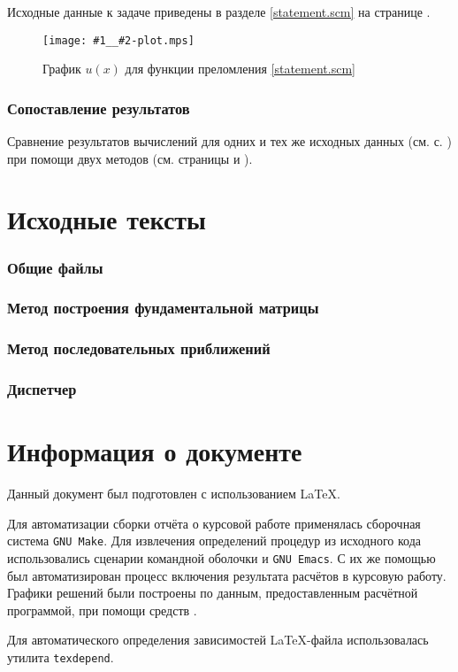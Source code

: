 \documentclass{article}
\newcommand{\includeplot}[2]{\begin{figure}[hb]
    \centering
    \texttt{[image: \#1\_\_\#2-plot.mps]}
    \caption{График $u(x)$ для функции преломления \eqref{#2}}
\end{figure}}
\numberwithin{equation}{section}
\begin{document}
Исходные данные к задаче приведены в разделе \ref{statement.scm} на
странице \pageref{statement.scm}.



\includeplot{iterative}{statement.scm}

\clearpage
\section{Сопоставление результатов}

Сравнение результатов вычислений для одних и тех же исходных данных
(см. с. \pageref{statement.scm}) при помощи двух методов (см. страницы
\pageref{fundmatrix__statement.scm-results} и
\pageref{iterative__statement.scm-results}).

\clearpage
\appendix
\part{Исходные тексты}
\section{Общие файлы}




\clearpage
\section{Метод построения  фундаментальной матрицы}



\clearpage
\section{Метод последовательных приближений}



\clearpage
\section{Диспетчер}



\clearpage
\part{Информация о документе}

Данный документ был подготовлен с использованием \LaTeX{}.

Для автоматизации сборки отчёта о курсовой работе применялась
сборочная система \texttt{GNU Make}. Для извлечения определений
процедур из исходного кода использовались сценарии командной оболочки
и \texttt{GNU Emacs}. С их же помощью был автоматизирован процесс
включения результата расчётов в курсовую работу. Графики решений были
построены по данным, предоставленным расчётной программой, при помощи
средств \MP.

Для автоматического определения зависимостей
\LaTeX{}-файла использовалась утилита \texttt{texdepend}.
\end{document}

